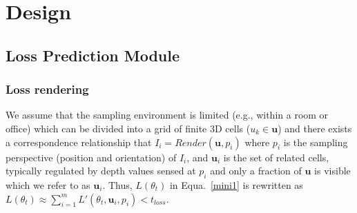 \section{Design}
\subsection{Loss Prediction Module}
\subsubsection{Loss rendering}

We assume that the sampling environment is limited (e.g., within a room or office) which can be divided into a grid of finite 3D cells ($u_k\in \bm{u}$) and there exists a correspondence relationship that $I_i = Render(\bm{u}, p_i)$ where $p_i$ is the sampling perspective (position and orientation) of $I_i$, and $\bm{u}_i$ is the set of related cells, typically regulated by depth values sensed at $p_i$ and only a fraction of $\bm{u}$ is visible which we refer to as $\bm{u}_i$.
Thus, 
$L(\theta_t)$ in Equa.~\ref{mini1} is rewritten as $L(\theta_t) \approx \sum_{i=1}^{m} L'(\theta_t, \bm{u}_i, p_i) < t_{loss}$.

